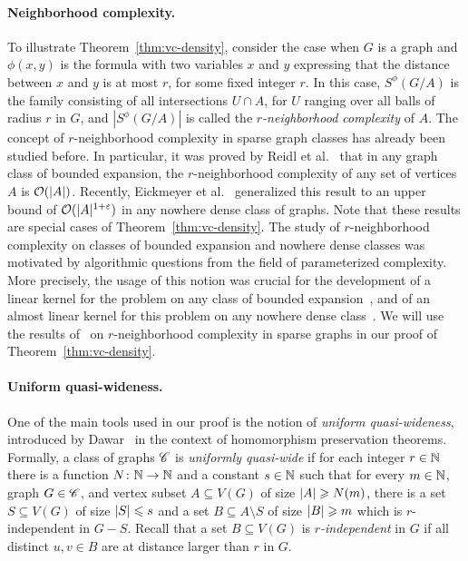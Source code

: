 \paragraph{Neighborhood complexity.}
To illustrate Theorem~\ref{thm:vc-density}, consider the case when
$G$ is a graph and  $\phi(x,y)$ is the formula with two variables $x$ and $y$ expressing that the distance between $x$ and $y$
is at most $r$, for some fixed integer $r$. In this case, $S^\phi(G/A)$ is the family consisting of all intersections $U\cap A$, for $U$ ranging over all balls of radius $r$ in $G$,
and  $|S^\phi(G/A)|$ is called the \emph{$r$-neighborhood complexity} of $A$.
The concept of $r$-neighborhood complexity in sparse graph classes has already been studied before.
In particular, it was proved by Reidl et al.~\cite{reidl2016characterising} that in any graph class of bounded expansion, the $r$-neighborhood complexity of any set of vertices $A$ is $\mathcal{O}(|A|)$.
Recently, Eickmeyer et al.~\cite{eickmeyer2016neighborhood} generalized this result to an upper bound of $\mathcal{O}(|A|^{1+\varepsilon})$ in any nowhere dense class of graphs.
Note that these results are special cases of Theorem~\ref{thm:vc-density}.
%
The study of $r$-neighborhood complexity on classes of bounded expansion and nowhere dense classes was motivated by algorithmic questions from the field of parameterized complexity.
More precisely, the usage of this notion was crucial for the development of a linear kernel for the {} problem on any class of bounded expansion~\cite{drange2016kernelization},
and of an almost linear kernel for this problem on any nowhere dense class~\cite{eickmeyer2016neighborhood}.
We will use the results of~\cite{drange2016kernelization,eickmeyer2016neighborhood} on $r$-neighborhood complexity in sparse graphs in our proof of Theorem~\ref{thm:vc-density}.

\paragraph{Uniform quasi-wideness.}
One of the main tools used in our proof 
is the notion of \emph{uniform quasi-wideness},
introduced by Dawar~\cite{dawar2010homomorphism}
in the context of homomorphism preservation theorems.
%
Formally, a class of graphs $\mathscr{C}$  is \emph{uniformly quasi-wide} if for each integer $r\in\mathbb{N}$ there is a function
 $N\colon \mathbb{N}\rightarrow \mathbb{N}$ and a constant  $s\in \mathbb{N}$ such
that for every $m\in \mathbb{N}$, graph $G\in \mathscr{C}$, and vertex subset $A\subseteq V(G)$ of size $\left\lvert A\right\rvert\geqslant N(m)$,
there is a set $S\subseteq V(G)$ of size $\left\lvert S\right\rvert\leqslant s$ and a set
$B\subseteq A\setminus S$ of size $\left\lvert B\right\rvert\geqslant m$ which is $r$-independent in
$G-S$. Recall that a set $B\subseteq V(G)$ is {\em{$r$-independent}} in $G$ if all
distinct $u,v\in B$ are at distance 
larger than $r$ in $G$.


